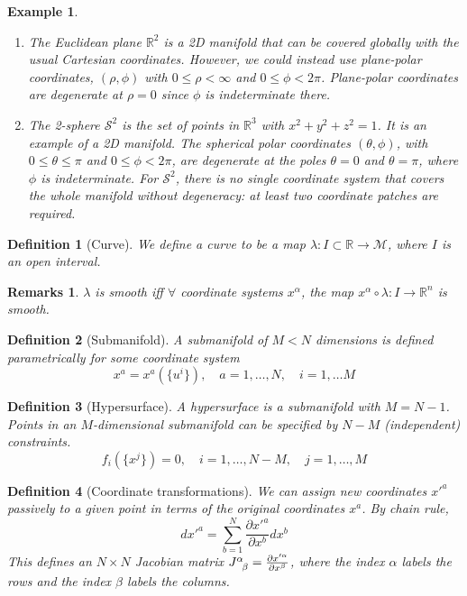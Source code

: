 \documentclass[a4paper]{article}
\newtheorem{eg}{Example}[section]
\newtheorem{remarks}{Remarks}[section]
\theoremstyle{new}
\newtheorem{defi}{Definition}[section]
\begin{document}
\begin{eg}\leavevmode
\begin{enumerate}
    \item The Euclidean plane $\mathbb{R}^2$ is a 2D manifold that can be covered globally with the usual Cartesian coordinates. However, we could instead use plane-polar coordinates, $(\rho, \phi)$ with $0\leq\rho<\infty$ and $0\leq\phi<2\pi$. Plane-polar coordinates are degenerate at $\rho= 0$ since $\phi$ is indeterminate there.
    \item The 2-sphere $\mathcal{S}^2$ is the set of points in $\mathbb{R}^3$ with $x^2+y^2+z^2 =1$. It is an example of a 2D manifold. The spherical polar coordinates $(\theta, \phi)$, with $0\leq\theta\leq\pi$ and $0\leq\phi < 2\pi$, are degenerate at the poles $\theta=0$ and $\theta = \pi$, where $\phi$ is indeterminate. For $\mathcal{S}^2$, there is no single coordinate system that covers the whole manifold without degeneracy: at least two coordinate patches are required.
\end{enumerate}
\end{eg}
\begin{defi}[Curve]
We define a curve to be a map $\lambda:I\subset\mathbb{R}\rightarrow\mathcal{M}$, where $I$ is an open interval. 
\end{defi}
\begin{remarks}
$\lambda$ is smooth iff $\forall$ coordinate systems $x^\alpha$, the map $x^\alpha\circ\lambda:I\rightarrow\mathbb{R}^n$ is smooth.
\end{remarks}
\begin{defi}[Submanifold]
A submanifold of $M<N$ dimensions is defined parametrically for some coordinate system
$$x^a=x^a(\{u^i\}),\quad a=1,\dots,N,\quad i=1,\dots M$$
\end{defi}
\begin{defi}[Hypersurface]
A hypersurface is a submanifold with $M=N-1$. Points in an $M$-dimensional submanifold can be specified by $N − M$ (independent) constraints.
$$f_i(\{x^j\})=0,\quad i=1,\dots,N-M,\quad j=1,\dots,M$$
\end{defi}
\begin{defi}[Coordinate transformations]
We can assign new coordinates $x'^a$ passively to a given point in terms of the original coordinates $x^a$. By chain rule,
$$dx'^a=\sum_{b=1}^N\frac{\partial x'^a}{\partial x^b}dx^b$$
This defines an $N\times N$ Jacobian matrix $\tensor*{J}{*_{}^{\alpha}_{\beta}}=\frac{\partial x'^\alpha}{\partial x^\beta}$, where the index $\alpha$ labels the rows and the index $\beta$ labels the columns.
\end{defi}
\end{document}

